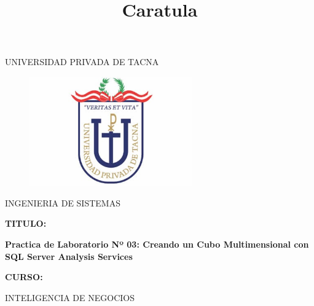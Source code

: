 \documentclass[12pt,letterpaper]{article}
\begin{document}
%


\title{Caratula}

\begin{titlepage}
\begin{center}
\large{UNIVERSIDAD PRIVADA DE TACNA}\\
\vspace*{-0.025in}
\begin{figure}[htb]
\begin{center}
\includegraphics[width=7cm]{./images/logo}
\end{center}
\end{figure}
\vspace*{0.15in}
INGENIERIA DE SISTEMAS  \\

\vspace*{0.3in}
\begin{large}
\textbf{TITULO:} \\
\end{large}

\vspace*{0.1in}
\begin{Large}
\textbf{Practica de Laboratorio Nº 03: Creando un Cubo Multimensional con SQL Server
Analysis Services} \\

\end{Large}

\vspace*{0.3in}
\begin{Large}
\textbf{CURSO:} \\
\end{Large}

\vspace*{0.1in}
\begin{large}
INTELIGENCIA DE NEGOCIOS\\
\end{large}


\end{center}
\end{titlepage}
\end{document}
